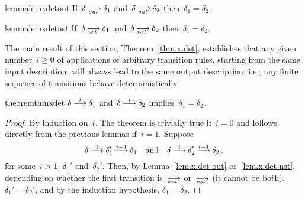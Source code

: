 \begin{restatable}{lemma}{lemxdetout}
  \label{lem.x.det-out}
  If~$\delta\out\delta_1$ and~$\delta\out\delta_2$ then~$\delta_1=\delta_2$.
\end{restatable}

\begin{restatable}{lemma}{lemxdetnst}
  \label{lem.x.det-nst}
  If~$\delta\nst\delta_1$ and~$\delta\nst\delta_2$ then~$\delta_1=\delta_2$.
\end{restatable}

The main result of this section, Theorem~\ref{thm.x.det}, establishes that
any given number~$i\ge0$ of applications of arbitrary transition rules,
starting from the same input description, will always lead to the same
output description, i.e., any finite sequence of transitions behave
deterministically.

\begin{restatable}[Determinism]{theorem}{thmxdet}
  \label{thm.x.det}
  $\delta\trans[i]\delta_1$ and~$\delta\trans[i]\delta_2$
  implies~$\delta_1=\delta_2$.
\end{restatable}

\begin{proof}
  By induction on~$i$.  The theorem is trivially true if~$i=0$ and follows
  directly from the previous lemmas if~$i=1$.  Suppose
  \[
    \delta\trans[1]\delta_1'\trans[i-1]\delta_1
    \quad\text{and}\quad
    \delta\trans[1]\delta_2'\trans[i-1]\delta_2\,,
  \]
  for some~$i>1$, $\delta_1'$ and~$\delta_2'$.
  Then, by Lemma~\ref{lem.x.det-out} or~\ref{lem.x.det-nst}, depending on
  whether the first transition is~$\out$ or~$\nst$ (it cannot be both),
  $\delta_1'=\delta_2'$, and by the induction hypothesis,
  $\delta_1=\delta_2$.
\end{proof}



